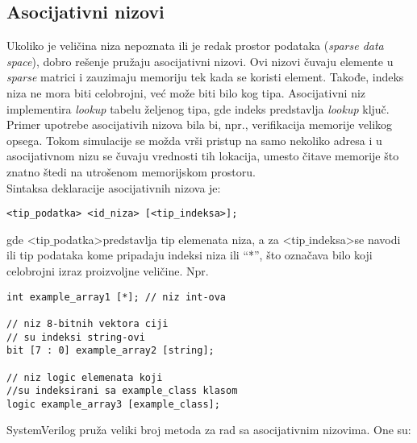 
\subsection{Asocijativni nizovi}

Ukoliko je veličina niza nepoznata ili je redak prostor podataka (\emph{sparse
  data space}), dobro rešenje pružaju asocijativni nizovi.
Ovi nizovi čuvaju elemente u \emph{sparse} matrici i zauzimaju memoriju tek kada
se koristi element.
Takođe, indeks niza ne mora biti celobrojni, već može biti bilo kog tipa.
Asocijativni niz implementira \emph{lookup} tabelu željenog tipa, gde indeks
predstavlja \emph{lookup} ključ.
Primer upotrebe asocijativih nizova bila bi, npr., verifikacija memorije velikog
opsega.
Tokom simulacije se možda vrši pristup na samo nekoliko adresa i u asocijativnom
nizu se čuvaju vrednosti tih lokacija, umesto čitave memorije što znatno štedi
na utrošenom memorijskom prostoru.\\

Sintaksa deklaracije asocijativnih nizova je:

\begin{lstlisting}
<tip_podatka> <id_niza> [<tip_indeksa>];
\end{lstlisting}

gde \textless tip\(\_\)podatka\textgreater predstavlja tip elemenata niza, a za
\textless tip\(\_\)indeksa\textgreater se navodi ili tip podataka kome pripadaju
indeksi niza ili ``*'', što označava bilo koji celobrojni izraz proizvoljne
veličine. Npr.

\begin{lstlisting}
int example_array1 [*]; // niz int-ova

// niz 8-bitnih vektora ciji
// su indeksi string-ovi
bit [7 : 0] example_array2 [string];

// niz logic elemenata koji
//su indeksirani sa example_class klasom
logic example_array3 [example_class];
\end{lstlisting}

SystemVerilog pruža veliki broj metoda za rad sa asocijativnim nizovima. One su:

